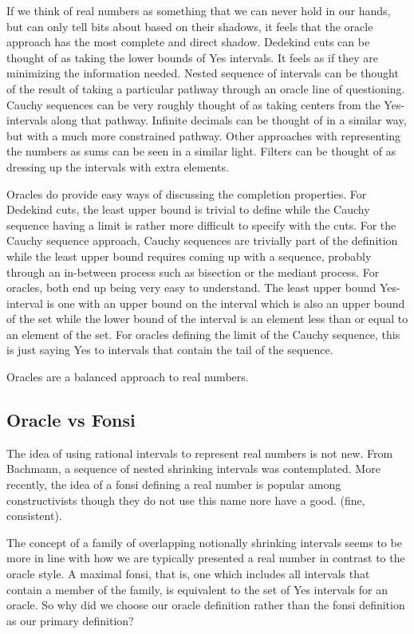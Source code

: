 \documentclass[12pt]{article}
\theoremstyle{remark}
\begin{document}
If we think of real numbers as something that we can never hold in our hands, but can only tell bits about based on their shadows, it feels that the oracle approach has the most complete and direct shadow. Dedekind cuts can be thought of as taking the lower bounds of Yes intervals. It feels as if they are minimizing the information needed.  Nested sequence of intervals can be thought of the result of taking a particular pathway through an oracle line of questioning. Cauchy sequences can be very roughly thought of as taking centers from the Yes-intervals along that pathway. Infinite decimals can be thought of in a similar way, but with a much more constrained pathway.  Other approaches with representing the numbers as sums can be seen in a  similar light. Filters can be thought of as dressing up the intervals with extra elements.

Oracles do provide easy ways of discussing the completion properties. For Dedekind cuts, the least upper bound is trivial to define while the Cauchy sequence having a limit is rather more difficult to specify with the cuts. For the Cauchy sequence approach, Cauchy sequences are trivially part of the definition while the least upper bound requires coming up with a sequence, probably through an in-between process such as bisection or the mediant process. For oracles, both end up being very easy to understand. The least upper bound Yes-interval is one with an upper bound on the interval which is also an upper bound of the set while the lower bound of the interval is an element less than or equal to an element of the set. For oracles defining the limit of the Cauchy sequence, this is just saying Yes to intervals that contain the tail of the sequence. 

Oracles are a balanced approach to real numbers. 

\subsection{Oracle vs Fonsi}

The idea of using rational intervals to represent real numbers is not new. From Bachmann, a sequence of nested shrinking intervals was contemplated. More recently, the idea of a fonsi defining a real number is popular among constructivists though they do not use this name nore have a good.  (fine, consistent).  

The concept of a family of overlapping notionally shrinking intervals seems to be more in line with how we are typically presented a real number in contrast to the oracle style. A maximal fonsi, that is, one which includes all intervals that contain a member of the family, is equivalent to the set of Yes intervals for an oracle.  So why did we choose our oracle definition rather than the fonsi definition as our primary definition? 
\end{document}
